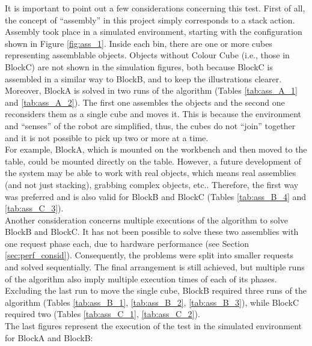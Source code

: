 It is important to point out a few considerations concerning this test. First of all, the concept of \enquote{assembly} in this project simply corresponds to a stack action. \\
Assembly took place in a simulated environment, starting with the configuration shown in Figure \ref{fig:ass_1}. 
Inside each bin, there are one or more cubes representing assemblable objects. Objects without Colour Cube (i.e., those in BlockC) are not shown in the simulation figures, both because BlockC is assembled in a similar way to BlockB, and to keep the illustrations clearer. \\
Moreover, BlockA is solved in two runs of the algorithm (Tables \ref{tab:ass_A_1} and \ref{tab:ass_A_2}). 
The first one assembles the objects and the second one reconsiders them as a single cube and moves it. This is because the environment and \enquote{senses} of the robot are simplified, thus, the cubes do not \enquote{join} together and it is not possible to pick up two or more at a time. \\
For example, BlockA, which is mounted on the workbench and then moved to the table, could be mounted directly on the table. However, a future development of the system may be able to work with real objects, which means real assemblies (and not just stacking), grabbing complex objects, etc.. Therefore, the first way was preferred and is also valid for BlockB and BlockC (Tables \ref{tab:ass_B_4} and \ref{tab:ass_C_3}). \\
Another consideration concerns multiple executions of the algorithm to solve BlockB and BlockC. It has not been possible to solve these two assemblies with one request phase each, due to hardware performance (see Section \ref{sec:perf_consid}). Consequently, the problems were split into smaller requests and solved sequentially. The final arrangement is still achieved, but multiple runs of the algorithm also imply multiple execution times of each of its phases.
Excluding the last run to move the single cube, BlockB required three runs of the algorithm (Tables \ref{tab:ass_B_1}, \ref{tab:ass_B_2}, \ref{tab:ass_B_3}), while BlockC required two (Tables \ref{tab:ass_C_1}, \ref{tab:ass_C_2}). \\
The last figures represent the execution of the test in the simulated environment for BlockA and BlockB:
